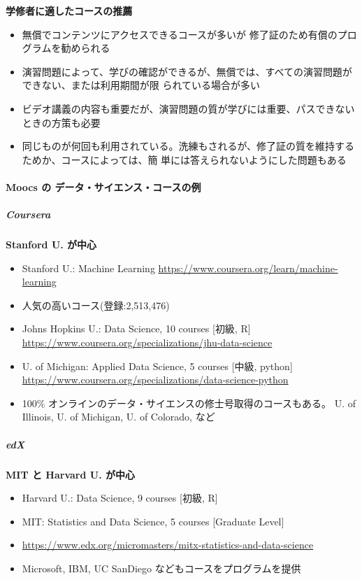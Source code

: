 \documentclass[
]{bxjsbook}
\providecommand{\tightlist}{%
  \setlength{\itemsep}{0pt}\setlength{\parskip}{0pt}}
\theoremstyle{definition}
\theoremstyle{definition}
\theoremstyle{definition}
\theoremstyle{definition}
\theoremstyle{remark}
\begin{document}
\textbf{学修者に適したコースの推薦}

\begin{itemize}
\tightlist
\item
  無償でコンテンツにアクセスできるコースが多いが 修了証のため有償のプログラムを勧められる
\item
  演習問題によって、学びの確認ができるが、無償では、すべての演習問題ができない、または利用期間が限
  られている場合が多い
\item
  ビデオ講義の内容も重要だが、演習問題の質が学びには重要、パスできないときの方策も必要
\item
  同じものが何回も利用されている。洗練もされるが、修了証の質を維持するためか、コースによっては、簡 単には答えられないようにした問題もある
\end{itemize}

\hypertarget{moocs-ux306e-ux30c7ux30fcux30bfux30b5ux30a4ux30a8ux30f3ux30b9ux30b3ux30fcux30b9ux306eux4f8b}{%
\paragraph{Moocs の データ・サイエンス・コースの例}\label{moocs-ux306e-ux30c7ux30fcux30bfux30b5ux30a4ux30a8ux30f3ux30b9ux30b3ux30fcux30b9ux306eux4f8b}}

\hypertarget{coursera}{%
\subparagraph{Coursera}\label{coursera}}

\textbf{Stanford U. が中心}

\begin{itemize}
\tightlist
\item
  Stanford U.: Machine Learning \url{https://www.coursera.org/learn/machine-learning}
\item
  人気の高いコース(登録:2,513,476)
\item
  Johns Hopkins U.: Data Science, 10 courses {[}初級, R{]} \url{https://www.coursera.org/specializations/jhu-data-science}
\item
  U. of Michigan: Applied Data Science, 5 courses {[}中級, python{]} \url{https://www.coursera.org/specializations/data-science-python}
\item
  100\% オンラインのデータ・サイエンスの修士号取得のコースもある。 U. of Illinois, U. of Michigan, U. of Colorado, など
\end{itemize}

\hypertarget{edx}{%
\subparagraph{edX}\label{edx}}

\textbf{MIT と Harvard U. が中心}

\begin{itemize}
\tightlist
\item
  Harvard U.: Data Science, 9 courses {[}初級, R{]}
\item
  MIT: Statistics and Data Science, 5 courses {[}Graduate Level{]}
\item
  \url{https://www.edx.org/micromasters/mitx-statistics-and-data-science}
\item
  Microsoft, IBM, UC SanDiego などもコースをプログラムを提供
\end{itemize}
\end{document}

